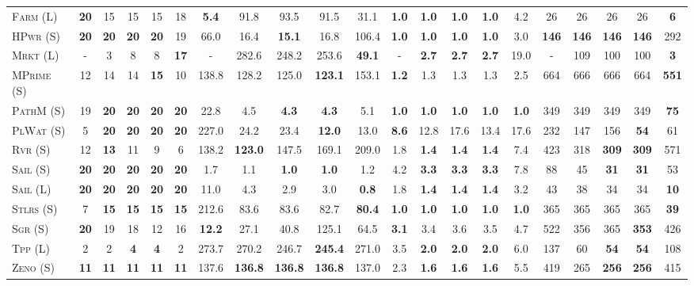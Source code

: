 \documentclass[11pt,landscape]{article}
\begin{document}
\begin{table}[tb]
{\begin{tabular}{|l||ccccc||ccccc||ccccc||ccccc||}
\textsc{Farm} (L)&\textbf{20}&15&15&15&18&\textbf{5.4}&91.8&93.5&91.5&31.1&\textbf{1.0}&\textbf{1.0}&\textbf{1.0}&\textbf{1.0}&4.2&26&26&26&26&\textbf{6}\\
\textsc{HPwr} (S)&\textbf{20}&\textbf{20}&\textbf{20}&\textbf{20}&19&66.0&16.4&\textbf{15.1}&16.8&106.4&\textbf{1.0}&\textbf{1.0}&\textbf{1.0}&\textbf{1.0}&3.0&\textbf{146}&\textbf{146}&\textbf{146}&\textbf{146}&292\\
\textsc{Mrkt} (L)&-&3&8&8&\textbf{17}&-&282.6&248.2&253.6&\textbf{49.1}&-&\textbf{2.7}&\textbf{2.7}&\textbf{2.7}&19.0&-&109&100&100&\textbf{3}\\
\textsc{MPrime} (S)&12&14&14&\textbf{15}&10&138.8&128.2&125.0&\textbf{123.1}&153.1&\textbf{1.2}&1.3&1.3&1.3&2.5&664&666&666&664&\textbf{551}\\
\textsc{PathM} (S)&19&\textbf{20}&\textbf{20}&\textbf{20}&\textbf{20}&22.8&4.5&\textbf{4.3}&\textbf{4.3}&5.1&\textbf{1.0}&\textbf{1.0}&\textbf{1.0}&\textbf{1.0}&\textbf{1.0}&349&349&349&349&\textbf{75}\\
\textsc{PlWat} (S)&5&\textbf{20}&\textbf{20}&\textbf{20}&\textbf{20}&227.0&24.2&23.4&\textbf{12.0}&13.0&\textbf{8.6}&12.8&17.6&13.4&17.6&232&147&156&\textbf{54}&61\\
\textsc{Rvr} (S)&12&\textbf{13}&11&9&6&138.2&\textbf{123.0}&147.5&169.1&209.0&1.8&\textbf{1.4}&\textbf{1.4}&\textbf{1.4}&7.4&423&318&\textbf{309}&\textbf{309}&571\\
\textsc{Sail} (S)&\textbf{20}&\textbf{20}&\textbf{20}&\textbf{20}&\textbf{20}&1.7&1.1&\textbf{1.0}&\textbf{1.0}&1.2&4.2&\textbf{3.3}&\textbf{3.3}&\textbf{3.3}&7.8&88&45&\textbf{31}&\textbf{31}&53\\
\textsc{Sail} (L)&\textbf{20}&\textbf{20}&\textbf{20}&\textbf{20}&\textbf{20}&11.0&4.3&2.9&3.0&\textbf{0.8}&1.8&\textbf{1.4}&\textbf{1.4}&\textbf{1.4}&3.2&43&38&34&34&\textbf{10}\\
\textsc{Stlrs} (S)&7&\textbf{15}&\textbf{15}&\textbf{15}&\textbf{15}&212.6&83.6&83.6&82.7&\textbf{80.4}&\textbf{1.0}&\textbf{1.0}&\textbf{1.0}&\textbf{1.0}&\textbf{1.0}&365&365&365&365&\textbf{39}\\
\textsc{Sgr} (S)&\textbf{20}&19&18&12&16&\textbf{12.2}&27.1&40.8&125.1&64.5&\textbf{3.1}&3.4&3.6&3.5&4.7&522&356&365&\textbf{353}&426\\
\textsc{Tpp} (L)&2&2&\textbf{4}&\textbf{4}&2&273.7&270.2&246.7&\textbf{245.4}&271.0&3.5&\textbf{2.0}&\textbf{2.0}&\textbf{2.0}&6.0&137&60&\textbf{54}&\textbf{54}&108\\
\textsc{Zeno} (S)&\textbf{11}&\textbf{11}&\textbf{11}&\textbf{11}&\textbf{11}&137.6&\textbf{136.8}&\textbf{136.8}&\textbf{136.8}&137.0&2.3&\textbf{1.6}&\textbf{1.6}&\textbf{1.6}&5.5&419&265&\textbf{256}&\textbf{256}&415\\

\end{tabular}}
\end{table}
\end{document}
